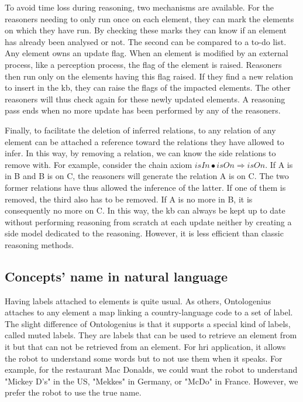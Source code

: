To avoid time loss during reasoning, two mechanisms are available. For the reasoners needing to only run once on each element, they can mark the elements on which they have run. By checking these marks they can know if an element has already been analysed or not. The second can be compared to a to-do list. Any element owns an update flag. When an element is modified by an external process, like a perception process, the flag of the element is raised. Reasoners then run only on the elements having this flag raised. If they find a new relation to insert in the \acrshort{kb}, they can raise the flags of the impacted elements. The other reasoners will thus check again for these newly updated elements. A reasoning pass ends when no more update has been performed by any of the reasoners.

Finally, to facilitate the deletion of inferred relations, to any relation of any element can be attached a reference toward the relations they have allowed to infer. In this way, by removing a relation, we can know the side relations to remove with. For example, consider the chain axiom $isIn \bullet isOn \Rightarrow isOn$. If A is in B and B is on C, the reasoners will generate the relation A is on C. The two former relations have thus allowed the inference of the latter. If one of them is removed, the third also has to be removed. If A is no more in B, it is consequently no more on C. In this way, the \acrshort{kb} can always be kept up to date without performing reasoning from scratch at each update neither by creating a side model dedicated to the reasoning. However, it is less efficient than classic reasoning methods.

\subsection{Concepts' name in natural language}

Having labels attached to elements is quite usual. As others, Ontologenius attaches to any element a map linking a country-language code to a set of label. The slight difference of Ontologenius is that it supports a special kind of labels, called muted labels. They are labels that can be used to retrieve an element from it but that can not be retrieved from an element. For \acrshort{hri} application, it allows the robot to understand some words but to not use them when it speaks. For example, for the restaurant Mac Donalds, we could want the robot to understand "Mickey D's" in the US, "Mekkes" in Germany, or "McDo" in France. However, we prefer the robot to use the true name.

